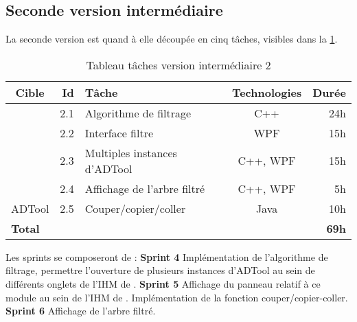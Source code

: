 	\subsection{Seconde version intermédiaire}
		La seconde version est quand à elle découpée en cinq tâches, visibles dans la \ttable{} \ref{tab:taches_units_2}.
		\begin{table}[h]
			\centering
			\begin{tabular}{|c|r|l|c|r|}
				\hline
				\textbf{Cible} & \textbf{Id} & \textbf{Tâche} & \textbf{Technologies} & \textbf{Durée}\\
				\hline

				\multirow{4}{*}{\glasir{}} & 2.1 & Algorithme de filtrage & C++ & 24h\\
				\cline{2-5}
				 & 2.2 & Interface filtre & WPF & 15h\\
				\cline{2-5}
				 & 2.3 & Multiples instances d'ADTool & C++, WPF & 15h\\
				\cline{2-5}
				 & 2.4 & Affichage de l'arbre filtré & C++, WPF & 5h\\
				\hline

				\multirow{1}{*}{ADTool} & 2.5 & Couper/copier/coller & \multirow{1}{*}{Java} & 10h\\
				\hline

				\multicolumn{4}{|l|}{\bf Total} & {\bf 69h}\\
				\hline
			\end{tabular}
			\caption{Tableau tâches version intermédiaire 2}
			\label{tab:taches_units_2}
		\end{table}
		Les sprints se composeront de :\newline
		\textbf{Sprint 4} Implémentation de l'algorithme de filtrage, permettre l'ouverture de plusieurs instances d'ADTool au sein de différents onglets de l'IHM de \glasir{}.\newline 
		\textbf{Sprint 5} Affichage du panneau relatif à ce module au sein de l'IHM de \glasir{}. Implémentation de la fonction couper/copier-coller.\newline %
		\textbf{Sprint 6} Affichage de l'arbre filtré.


